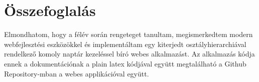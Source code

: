 \chapter{Összefoglalás}\label{sect:Summary}

\hspace{2mm} Elmondhatom, hogy a félév során rengeteget tanultam, megismerkedtem modern webfejlesztési eszközökkel és implementáltam egy kiterjedt osztályhierarchiával rendelkező komoly naptár kezeléssel bíró webes alkalmazást. Az alkalmazás kódja ennek a dokumentációnak a plain latex kódjával együtt megtalálható a Github Repository-mban \cite{TDoneRepo}  a webes applikációval együtt. \cite{TDoneWeb}